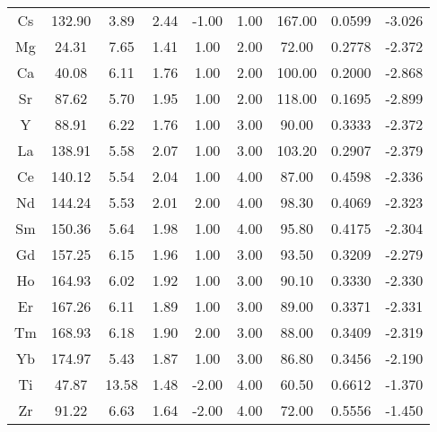 \begin{center}
\begin{longtable}{c|c@{\hskip3pt} c@{\hskip3pt} c@{\hskip3pt} c@{\hskip3pt} c@{\hskip3pt} c@{\hskip3pt} c@{\hskip3pt} c@{\hskip3pt}}
Cs        & 132.90      & 3.89     & 2.44    & -1.00        & 1.00           & 167.00         & 0.0599          & -3.026   \\
Mg        & 24.31       & 7.65     & 1.41    & 1.00         & 2.00           & 72.00          & 0.2778          & -2.372   \\
Ca        & 40.08       & 6.11     & 1.76    & 1.00         & 2.00           & 100.00         & 0.2000          & -2.868   \\
Sr        & 87.62       & 5.70     & 1.95    & 1.00         & 2.00           & 118.00         & 0.1695          & -2.899   \\
Y         & 88.91       & 6.22     & 1.76    & 1.00         & 3.00           & 90.00          & 0.3333          & -2.372   \\
La        & 138.91      & 5.58     & 2.07    & 1.00         & 3.00           & 103.20         & 0.2907          & -2.379   \\
Ce        & 140.12      & 5.54     & 2.04    & 1.00         & 4.00           & 87.00          & 0.4598          & -2.336   \\
Nd        & 144.24      & 5.53     & 2.01    & 2.00         & 4.00           & 98.30          & 0.4069          & -2.323   \\
Sm        & 150.36      & 5.64     & 1.98    & 1.00         & 4.00           & 95.80          & 0.4175          & -2.304   \\
Gd        & 157.25      & 6.15     & 1.96    & 1.00         & 3.00           & 93.50          & 0.3209          & -2.279   \\
Ho        & 164.93      & 6.02     & 1.92    & 1.00         & 3.00           & 90.10          & 0.3330          & -2.330   \\
Er        & 167.26      & 6.11     & 1.89    & 1.00         & 3.00           & 89.00          & 0.3371          & -2.331   \\
Tm        & 168.93      & 6.18     & 1.90    & 2.00         & 3.00           & 88.00          & 0.3409          & -2.319   \\
Yb        & 174.97      & 5.43     & 1.87    & 1.00         & 3.00           & 86.80          & 0.3456          & -2.190   \\
Ti        & 47.87       & 13.58    & 1.48    & -2.00        & 4.00           & 60.50          & 0.6612          & -1.370   \\
Zr        & 91.22       & 6.63     & 1.64    & -2.00        & 4.00           & 72.00          & 0.5556          & -1.450   \\

\end{longtable}
\end{center}
